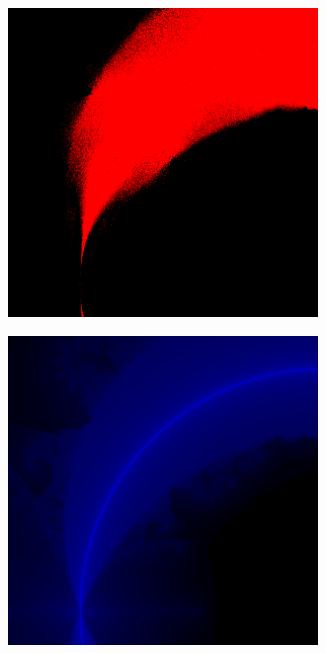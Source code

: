 \documentclass{article}
\begin{document}
\begin{figure}[!h]
 \caption{Zoom $3.13843$, gecentreerd rond $z = \frac{1}{2} + \frac{1}{2}i$}
 \begin{subfigure}{0.49\textwidth}
  \includegraphics[width=0.9\textwidth]{elegant-gl/scrsh/left_9}
 \end{subfigure}
 \begin{subfigure}{0.49\textwidth}
  \includegraphics[width=0.9\textwidth]{elegant-gl/scrsh/right_9}
 \end{subfigure}
\end{figure}
\end{document}
